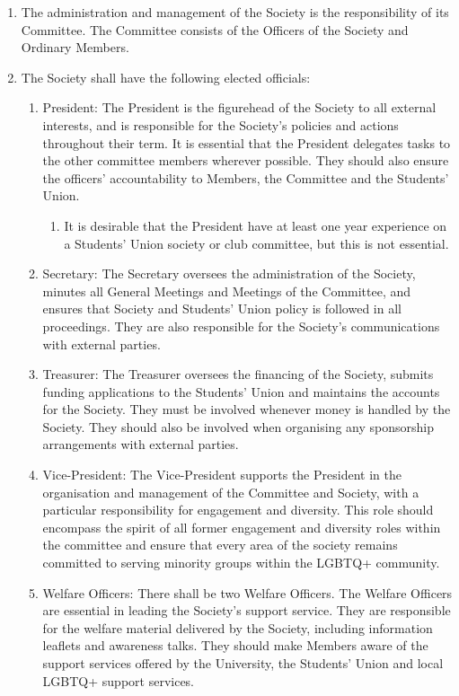 \documentclass[12pt]{constitution}
\begin{document}
\begin{enumerate}
    \item The administration and management of the Society is the responsibility of its Committee. The Committee consists of the Officers of the Society and Ordinary Members.
    \item \label{subclause:elected-officials} The Society shall have the following elected officials:
    \begin{enumerate}
        \item President: The President is the figurehead of the Society to all external interests, and is responsible for the Society’s policies and actions throughout their term. It is essential that the President delegates tasks to the other committee members wherever possible. They should also ensure the officers’ accountability to Members, the Committee and the Students’ Union.
        \begin{enumerate}
            \item It is desirable that the President have at least one year experience on a Students’ Union society or club committee, but this is not essential.
        \end{enumerate}
        \item Secretary: The Secretary oversees the administration of the Society, minutes all General Meetings and Meetings of the Committee, and ensures that Society and Students’ Union policy is followed in all proceedings. They are also responsible for the Society’s communications with external parties.
        \item Treasurer: The Treasurer oversees the financing of the Society, submits funding applications to the Students’ Union and maintains the accounts for the Society. They must be involved whenever money is handled by the Society. They should also be involved when organising any sponsorship arrangements with external parties.
        \item Vice-President: The Vice-President supports the President in the organisation and management of the Committee and Society, with a particular responsibility for engagement and diversity. This role should encompass the spirit of all former engagement and diversity roles within the committee and ensure that every area of the society remains committed to serving minority groups within the LGBTQ+ community.
        \item Welfare Officers: There shall be two Welfare Officers. The Welfare Officers are essential in leading the Society’s support service. They are responsible for the welfare material delivered by the Society, including information leaflets and awareness talks. They should make Members aware of the support services offered by the University, the Students’ Union and local LGBTQ+ support services.

\end{enumerate}
\end{enumerate}
\end{document}
